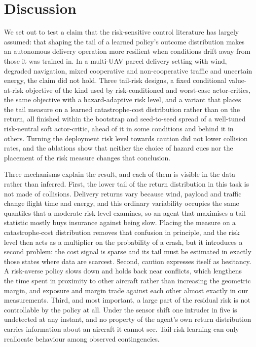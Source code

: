 \section*{Discussion}

We set out to test a claim that the risk-sensitive control literature has largely assumed: that shaping the tail of a learned policy's outcome distribution makes an autonomous delivery operation more resilient when conditions drift away from those it was trained in. In a multi-UAV parcel delivery setting with wind, degraded navigation, mixed cooperative and non-cooperative traffic and uncertain energy, the claim did not hold. Three tail-risk designs, a fixed conditional value-at-risk objective of the kind used by risk-conditioned and worst-case actor-critics, the same objective with a hazard-adaptive risk level, and a variant that places the tail measure on a learned catastrophe-cost distribution rather than on the return, all finished within the bootstrap and seed-to-seed spread of a well-tuned risk-neutral soft actor-critic, ahead of it in some conditions and behind it in others. Turning the deployment risk level towards caution did not lower collision rates, and the ablations show that neither the choice of hazard cues nor the placement of the risk measure changes that conclusion.

Three mechanisms explain the result, and each of them is visible in the data rather than inferred. First, the lower tail of the return distribution in this task is not made of collisions. Delivery returns vary because wind, payload and traffic change flight time and energy, and this ordinary variability occupies the same quantiles that a moderate risk level examines, so an agent that maximises a tail statistic mostly buys insurance against being slow. Placing the measure on a catastrophe-cost distribution removes that confusion in principle, and the risk level then acts as a multiplier on the probability of a crash, but it introduces a second problem: the cost signal is sparse and its tail must be estimated in exactly those states where data are scarcest. Second, caution expresses itself as hesitancy. A risk-averse policy slows down and holds back near conflicts, which lengthens the time spent in proximity to other aircraft rather than increasing the geometric margin, and exposure and margin trade against each other almost exactly in our measurements. Third, and most important, a large part of the residual risk is not controllable by the policy at all. Under the sensor shift one intruder in five is undetected at any instant, and no property of the agent's own return distribution carries information about an aircraft it cannot see. Tail-risk learning can only reallocate behaviour among observed contingencies.

